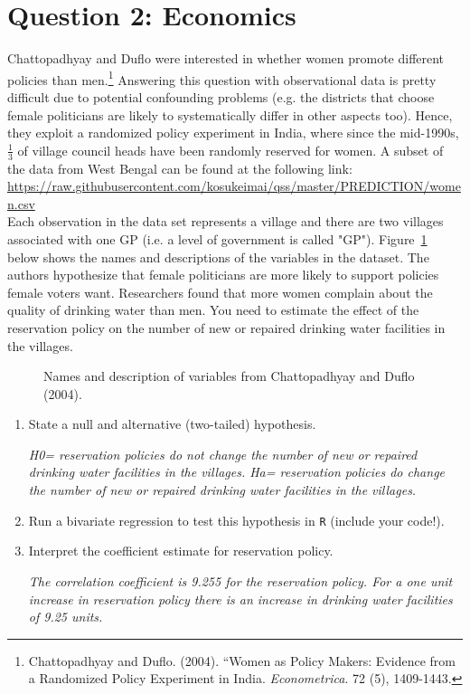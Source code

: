 \documentclass[12pt,letterpaper]{article}
\begin{document}
\section*{Question 2: Economics}
Chattopadhyay and Duflo were interested in whether women promote different policies than men.\footnote{Chattopadhyay and Duflo. (2004). ``Women as Policy Makers: Evidence from a Randomized Policy Experiment in India. \textit{Econometrica}. 72 (5), 1409-1443.} Answering this question with observational data is pretty difficult due to potential confounding problems (e.g. the districts that choose female politicians are likely to systematically differ in other aspects too). Hence, they exploit a randomized policy experiment in India, where since the mid-1990s, $\frac{1}{3}$ of village council heads have been randomly reserved for women. A subset of the data from West Bengal can be found at the following link: \url{https://raw.githubusercontent.com/kosukeimai/qss/master/PREDICTION/women.csv}\\

\noindent Each observation in the data set represents a village and there are two villages associated with one GP (i.e. a level of government is called "GP"). Figure~\ref{fig:women_desc} below shows the names and descriptions of the variables in the dataset. The authors hypothesize that female politicians are more likely to support policies female voters want. Researchers found that more women complain about the quality of drinking water than men. You need to estimate the effect of the reservation policy on the number of new or repaired drinking water facilities in the villages.
\vspace{.5cm}
\begin{figure}[h!]
	\caption{\footnotesize{Names and description of variables from Chattopadhyay and Duflo (2004).}}
	\vspace{.5cm}
	\centering
	\label{fig:women_desc}
\end{figure}		

\newpage
\begin{enumerate}
	\item [(a)] State a null and alternative (two-tailed) hypothesis.
	
    \textit{H0= reservation policies do not change the number of new or repaired drinking water facilities in the villages. Ha= reservation policies do change the number of new or repaired drinking water facilities in the villages.}
	\vspace{6cm}
	\item [(b)] Run a bivariate regression to test this hypothesis in \texttt{R} (include your code!).
	
	\vspace{6cm}
	\item [(c)] Interpret the coefficient estimate for reservation policy. 
	
	\textit{The correlation coefficient is 9.255 for the reservation policy. For a one unit increase in reservation policy there is an increase in drinking water facilities of 9.25 units.}
\end{enumerate}
\end{document}
